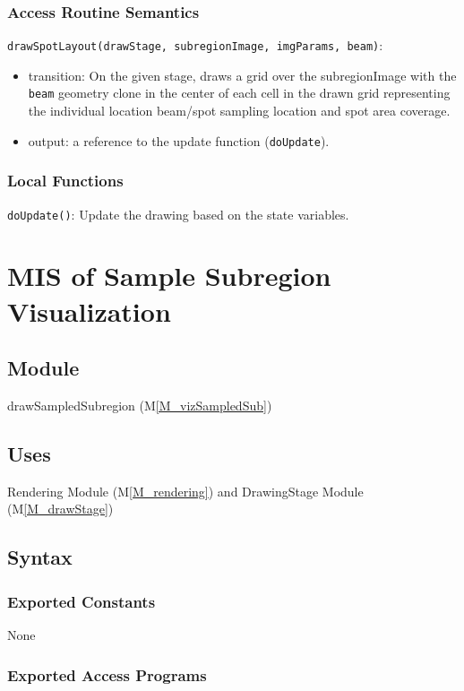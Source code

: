 \documentclass[12pt, titlepage]{article}
\newcommand{\mref}[1]{M\ref{#1}}
\newcommand{\mrefp}[1]{(\mref{#1})}
\newcommand{\mreff}[1]{Module \mrefp{#1}}
\newcommand{\code}[1]{\texttt{#1}}
\begin{document}
\subsubsection{Access Routine Semantics}

\noindent \code{drawSpotLayout(drawStage, subregionImage, imgParams, beam)}:
\begin{itemize}
\item transition: On the given stage, draws a grid over the subregionImage with
  the \code{beam} geometry clone in the center of each cell in the drawn grid
  representing the individual location beam/spot sampling location and spot area coverage.
\item output: a reference to the update function (\code{doUpdate}).
\end{itemize}

\subsubsection{Local Functions}
\code{doUpdate()}: Update the drawing based on the state variables.

\newpage



\section{MIS of Sample Subregion Visualization} \label{MS_vizSampledSub}

\subsection{Module}
drawSampledSubregion \mrefp{M_vizSampledSub}

\subsection{Uses}
Rendering \mreff{M_rendering} and DrawingStage \mreff{M_drawStage}

\subsection{Syntax}

\subsubsection{Exported Constants}
None
\subsubsection{Exported Access Programs}
\end{document}
